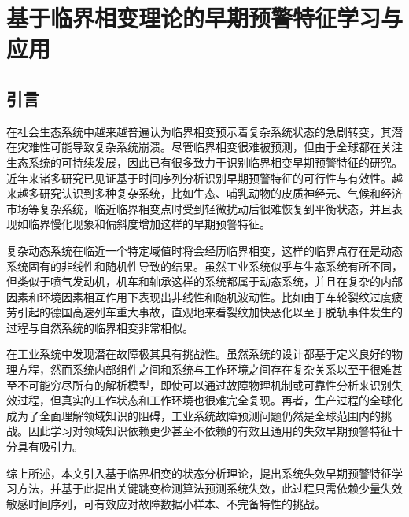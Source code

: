 
\chapter{基于临界相变理论的早期预警特征学习与应用}
\label{chap:critical-transection}

\section{引言}

在社会生态系统中越来越普遍认为临界相变预示着复杂系统状态的急剧转变，其潜在灾难性可能导致复杂系统崩溃\cite{scheffer2009critical,scheffer2012anticipating}。尽管临界相变很难被预测，但由于全球都在关注生态系统的可持续发展，因此已有很多致力于识别临界相变早期预警特征的研究。近年来诸多研究已见证基于时间序列分析识别早期预警特征的可行性与有效性\cite{scheffer2009early,wang2012flickering,boettiger2012quantifying}。越来越多研究认识到多种复杂系统，比如生态\cite{scheffer2001catastrophic,rietkerk2004self,carpenter2011early}、哺乳动物的皮质神经元\cite{meisel2015critical}、气候\cite{lenton2008tipping}和经济市场\cite{may2008complex}等复杂系统，临近临界相变点时受到轻微扰动后很难恢复到平衡状态，并且表现如临界慢化现象\cite{scheffer2009early}和偏斜度增加\cite{guttal2008changing}这样的早期预警特征。

复杂动态系统在临近一个特定域值时将会经历临界相变\cite{ladyman2013complex}，这样的临界点存在是动态系统固有的非线性和随机性导致的结果\cite{bar1997dynamics,endy2005foundations}。虽然工业系统似乎与生态系统有所不同，但类似于喷气发动机，机车和轴承这样的系统都属于动态系统，并且在复杂的内部因素和环境因素相互作用下表现出非线性和随机波动性\cite{strogatz2018nonlinear,cotilla2012predicting}。比如由于车轮裂纹过度疲劳引起的德国高速列车重大事故\cite{oestern2000facts}，直观地来看裂纹加快恶化以至于脱轨事件发生的过程与自然系统的临界相变非常相似。

在工业系统中发现潜在故障极其具有挑战性。虽然系统的设计都基于定义良好的物理方程，然而系统内部组件之间和系统与工作环境之间存在复杂关系以至于很难甚至不可能穷尽所有的解析模型\cite{chan2007data}，即使可以通过故障物理机制或可靠性分析来识别失效过程，但真实的工作状态和工作环境也很难完全复现。再者，生产过程的全球化成为了全面理解领域知识的阻碍，工业系统故障预测问题仍然是全球范围内的挑战。因此学习对领域知识依赖更少甚至不依赖的有效且通用的失效早期预警特征十分具有吸引力。

综上所述，本文引入基于临界相变的状态分析理论，提出系统失效早期预警特征学习方法，并基于此提出关键跳变检测算法预测系统失效，此过程只需依赖少量失效敏感时间序列，可有效应对故障数据小样本、不完备特性的挑战。

